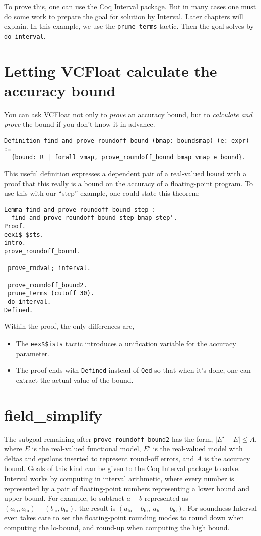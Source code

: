 \documentclass[article]{memoir}
\begin{document}
To prove this, one can use the Coq Interval package.  But in many
cases one must do some work to prepare the goal for solution by
Interval.  Later chapters will explain.
In this example, we use the \lstinline{prune_terms} tactic.
Then the goal solves by \lstinline{do_interval}.

\chapter{Letting VCFloat calculate the accuracy bound}

You can ask VCFloat not only to \emph{prove} an accuracy bound,
but to \emph{calculate and prove} the bound if you don't know it
in advance.

\begin{lstlisting}
Definition find_and_prove_roundoff_bound (bmap: boundsmap) (e: expr) :=
  {bound: R | forall vmap, prove_roundoff_bound bmap vmap e bound}.
\end{lstlisting}

This useful definition expresses a dependent pair of a real-valued
\lstinline{bound} with a proof that this really is a bound
on the accuracy of a floating-point program.  To use this with
our ``step'' example, one could state this theorem:

\begin{lstlisting}
Lemma find_and_prove_roundoff_bound_step :
  find_and_prove_roundoff_bound step_bmap step'.
Proof.
eexi$ $sts.
intro.
prove_roundoff_bound.
-
 prove_rndval; interval.
-
 prove_roundoff_bound2.
 prune_terms (cutoff 30).
 do_interval.
Defined.
\end{lstlisting}

Within the proof, the only differences are,
\begin{itemize}
\item  The \lstinline{eex$$ists} tactic introduces a unification variable
  for the accuracy parameter.
\item The proof ends with \lstinline{Defined} instead of \lstinline{Qed}
  so that when it's done, one can extract the actual value of the bound.
\end{itemize}

\chapter{field\_simplify}

The subgoal remaining after \lstinline{prove_roundoff_bound2} has the
form, $|E'-E|\le A$, where $E$ is the real-valued functional model,
$E'$ is the real-valued model with deltas and epsilons inserted to
represent round-off errors, and $A$ is the accuracy bound.
Goals of this kind can be given to the Coq Interval package to solve.
Interval works by computing in interval arithmetic,
where every number is represented by a pair of floating-point numbers
representing a lower bound and upper bound.  For example, to subtract
$a-b$ represented as $(a_\mathrm{lo},a_\mathrm{hi})-(b_\mathrm{lo},b_\mathrm{hi})$,
the result is $(a_\mathrm{lo}-b_\mathrm{hi},~a_\mathrm{hi}-b_\mathrm{lo})$.
For soundness Interval even takes care to set the floating-point rounding modes
to round down when computing the lo-bound, and round-up when computing
the high bound.
\end{document}
